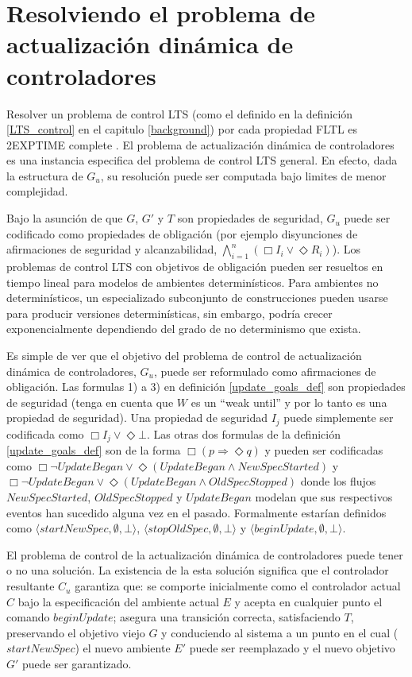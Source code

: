 \section{Resolviendo el problema de actualización dinámica de controladores}

Resolver un problema de control LTS (como el definido en la definición \ref{LTS_control} en el capitulo
\ref{background}) por cada propiedad FLTL es 2EXPTIME complete \cite{Pnueli:1989:SRM:75277.75293}. El problema de
actualización dinámica de controladores es una instancia especifica del problema de control LTS general. En efecto, dada
la estructura de $G_u$, su resolución puede ser computada bajo limites de menor complejidad.

Bajo la asunción de que $G$, $G'$ y $T$ son propiedades de seguridad, $G_u$ puede ser codificado como propiedades de
obligación (por ejemplo disyunciones de afirmaciones de seguridad y alcanzabilidad, $\bigwedge^n_{i=1}(\Box I_i \lor
\Diamond R_i)$). Los problemas de control LTS con objetivos de obligación pueden ser resueltos en tiempo lineal para
modelos de ambientes determinísticos. Para ambientes no determinísticos, un especializado subconjunto de construcciones
pueden usarse para producir versiones determinísticas, sin embargo, podría crecer exponencialmente dependiendo del grado
de no determinismo que exista.

Es simple de ver que el objetivo del problema de control de actualización dinámica de controladores, $G_u$, puede ser
reformulado como afirmaciones de obligación. Las formulas 1) a 3) en definición \ref{update_goals_def} son propiedades
de seguridad (tenga en cuenta que $W$ es un ``weak until'' y por lo tanto es una propiedad de seguridad). Una propiedad
de seguridad $I_j$ puede simplemente ser codificada como $\Box I_j \lor \Diamond \bot$. Las otras dos formulas de la
definición \ref{update_goals_def} son de la forma $\Box(p \Longrightarrow \Diamond q)$ y pueden ser codificadas como
$\Box \neg UpdateBegan \lor \Diamond (UpdateBegan \wedge NewSpecStarted)$ y $\Box \neg UpdateBegan \lor \Diamond
(UpdateBegan \wedge OldSpecStopped)$ donde los flujos $NewSpecStarted$, $OldSpecStopped$ y $UpdateBegan$ modelan que sus
respectivos eventos han sucedido alguna vez en el pasado. Formalmente estarían definidos como $\langle{startNewSpec},
\emptyset, \bot \rangle$, $\langle{stopOldSpec}, \emptyset, \bot \rangle$ y $\langle{beginUpdate}, \emptyset, \bot
\rangle$.

El problema de control de la actualización dinámica de controladores puede tener o no una solución. La existencia de la
esta solución significa que el controlador resultante $C_u$ garantiza que: se comporte inicialmente como el controlador
actual $C$ bajo la especificación del ambiente actual $E$ y acepta en cualquier punto el comando $beginUpdate$; asegura
una transición correcta, satisfaciendo $T$, preservando el objetivo viejo $G$ y conduciendo al sistema a un punto en el
cual ($startNewSpec$) el nuevo ambiente $E'$ puede ser reemplazado y el nuevo objetivo $G'$ puede ser garantizado.

